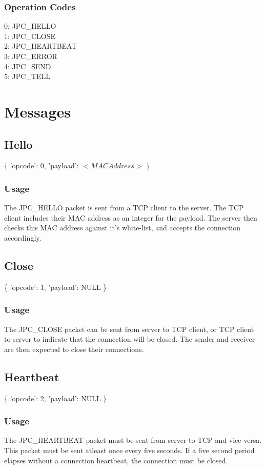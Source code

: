 \documentclass[a4paper, 10pt]{article}
\begin{document}
	\subsubsection{Operation Codes}
	0: JPC\_HELLO\\
	1: JPC\_CLOSE\\
	2: JPC\_HEARTBEAT\\
	3: JPC\_ERROR\\
	4: JPC\_SEND\\
	5: JPC\_TELL\\
	
\section{Messages}
	\subsection{Hello}
	\{ 'opcode': 0, 'payload': $<MAC Address>$ \}
		\subsubsection{Usage}
		The JPC\_HELLO packet is sent from a TCP client to the server. The TCP client includes their MAC address as an integer for the payload. The server then checks this MAC address against it's white-list, and accepts the connection accordingly.
		
	\subsection{Close}
	\{ 'opcode': 1, 'payload': NULL \}
		\subsubsection{Usage}
		The JPC\_CLOSE packet can be sent from server to TCP client, or TCP client to server to indicate that the connection will be closed. The sender and receiver are then expected to close their connections.
	
	\subsection{Heartbeat}
	\{ 'opcode': 2, 'payload': NULL \}
		\subsubsection{Usage}
		The JPC\_HEARTBEAT packet must be sent from server to TCP and vice versa. This packet must be sent atleast once every five seconds. If a five second period elapses without a connection heartbeat, the connection must be closed.
	
\end{document}
